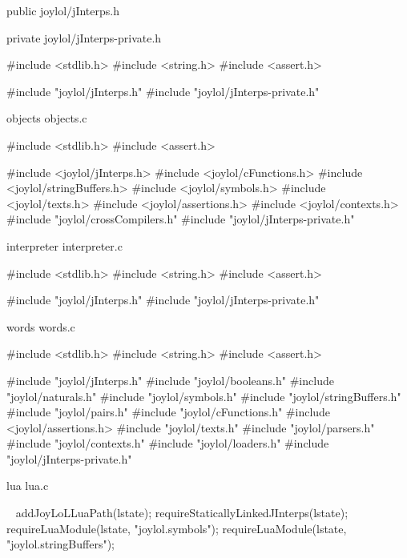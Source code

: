 \createCHeaderFile%
  {public}%
  {joylol/jInterps.h}%
  {}

\createCHeaderFile%
  {private}%
  {joylol/jInterps-private.h}%
  {}

\startCCode
#include <stdlib.h>
#include <string.h>
#include <assert.h>

#include "joylol/jInterps.h"
#include "joylol/jInterps-private.h"
\stopCCode

\createCCodeFile%
  {objects}%
  {objects.c}%
  {}

\startCCode
#include <stdlib.h>
#include <assert.h>

#include <joylol/jInterps.h>
#include <joylol/cFunctions.h>
#include <joylol/stringBuffers.h>
#include <joylol/symbols.h>
#include <joylol/texts.h>
#include <joylol/assertions.h>
#include <joylol/contexts.h>
#include "joylol/crossCompilers.h"
#include "joylol/jInterps-private.h"
\stopCCode

\createCCodeFile%
  {interpreter}%
  {interpreter.c}%
  {}

\startCCode
#include <stdlib.h>
#include <string.h>
#include <assert.h>

#include "joylol/jInterps.h"
#include "joylol/jInterps-private.h"
\stopCCode

\createCCodeFile%
  {words}%
  {words.c}%
  {}

\startCCode
#include <stdlib.h>
#include <string.h>
#include <assert.h>

#include "joylol/jInterps.h"
#include "joylol/booleans.h"
#include "joylol/naturals.h"
#include "joylol/symbols.h"
#include "joylol/stringBuffers.h"
#include "joylol/pairs.h"
#include "joylol/cFunctions.h"
#include <joylol/assertions.h>
#include "joylol/texts.h"
#include "joylol/parsers.h"
#include "joylol/contexts.h"
#include "joylol/loaders.h"
#include "joylol/jInterps-private.h"
\stopCCode

\createCCodeFile%
  {lua}%
  {lua.c}%
  {}

\CTestsSetup\
\startCTest
  addJoyLoLLuaPath(lstate);
  requireStaticallyLinkedJInterps(lstate);
  requireLuaModule(lstate, "joylol.symbols");
  requireLuaModule(lstate, "joylol.stringBuffers");
  
